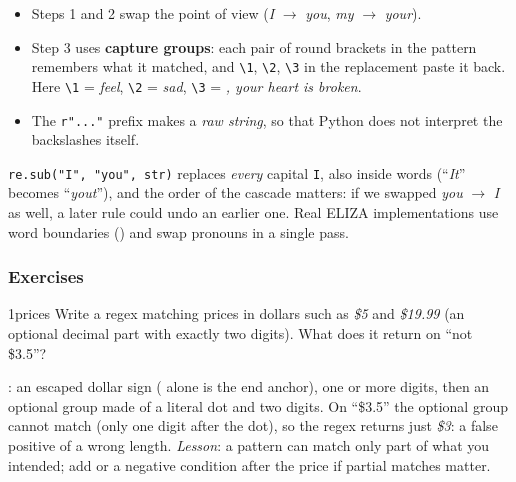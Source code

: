 \begin{itemize}[nosep]
  \item Steps 1 and 2 swap the point of view (\emph{I} $\to$ \emph{you},
        \emph{my} $\to$ \emph{your}).
  \item Step 3 uses \textbf{capture groups}: each pair of round brackets in the pattern
        remembers what it matched, and \texttt{\textbackslash 1}, \texttt{\textbackslash 2},
        \texttt{\textbackslash 3} in the replacement paste it back. Here
        \texttt{\textbackslash 1} = \emph{feel}, \texttt{\textbackslash 2} = \emph{sad},
        \texttt{\textbackslash 3} = \emph{, your heart is broken}.
  \item The \texttt{r"..."} prefix makes a \emph{raw string}, so that Python does not
        interpret the backslashes itself.
\end{itemize}

\begin{nbwarning}
\texttt{re.sub("I", "you", str)} replaces \emph{every} capital \texttt{I}, also inside
words (``\emph{It}'' becomes ``\emph{yout}''), and the order of the cascade matters: if
we swapped \emph{you} $\to$ \emph{I} as well, a later rule could undo an earlier one. Real
ELIZA implementations use word boundaries () and
swap pronouns in a single pass.
\end{nbwarning}

\subsubsection{Exercises}
\notinslides

\begin{nbexercise}{1}{prices}
Write a regex matching prices in dollars such as \emph{\$5} and \emph{\$19.99} (an
optional decimal part with exactly two digits). What does it return on ``not \$3.5''?
\end{nbexercise}
\begin{nbsolution}
: an escaped dollar sign (\re{\$}
alone is the end anchor), one or more digits, then an optional group made of a literal
dot and two digits. On ``\$3.5'' the optional group cannot match (only one digit after the
dot), so the regex returns just \emph{\$3}: a false positive of a wrong length.
\emph{Lesson}: a pattern can match only part of what you intended; add
 or a negative condition after the price if partial matches matter.
\end{nbsolution}

